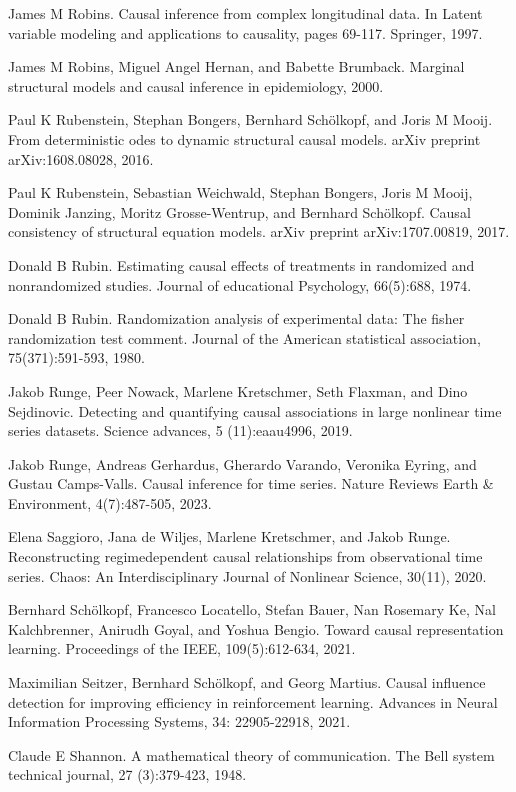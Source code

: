 \documentclass[10pt]{article}
\begin{document}
James M Robins. Causal inference from complex longitudinal data. In Latent variable modeling and applications to causality, pages 69-117. Springer, 1997.

James M Robins, Miguel Angel Hernan, and Babette Brumback. Marginal structural models and causal inference in epidemiology, 2000.

Paul K Rubenstein, Stephan Bongers, Bernhard Schölkopf, and Joris M Mooij. From deterministic odes to dynamic structural causal models. arXiv preprint arXiv:1608.08028, 2016.

Paul K Rubenstein, Sebastian Weichwald, Stephan Bongers, Joris M Mooij, Dominik Janzing, Moritz Grosse-Wentrup, and Bernhard Schölkopf. Causal consistency of structural equation models. arXiv preprint arXiv:1707.00819, 2017.

Donald B Rubin. Estimating causal effects of treatments in randomized and nonrandomized studies. Journal of educational Psychology, 66(5):688, 1974.

Donald B Rubin. Randomization analysis of experimental data: The fisher randomization test comment. Journal of the American statistical association, 75(371):591-593, 1980.

Jakob Runge, Peer Nowack, Marlene Kretschmer, Seth Flaxman, and Dino Sejdinovic. Detecting and quantifying causal associations in large nonlinear time series datasets. Science advances, 5 (11):eaau4996, 2019.

Jakob Runge, Andreas Gerhardus, Gherardo Varando, Veronika Eyring, and Gustau Camps-Valls. Causal inference for time series. Nature Reviews Earth \& Environment, 4(7):487-505, 2023.

Elena Saggioro, Jana de Wiljes, Marlene Kretschmer, and Jakob Runge. Reconstructing regimedependent causal relationships from observational time series. Chaos: An Interdisciplinary Journal of Nonlinear Science, 30(11), 2020.

Bernhard Schölkopf, Francesco Locatello, Stefan Bauer, Nan Rosemary Ke, Nal Kalchbrenner, Anirudh Goyal, and Yoshua Bengio. Toward causal representation learning. Proceedings of the IEEE, 109(5):612-634, 2021.

Maximilian Seitzer, Bernhard Schölkopf, and Georg Martius. Causal influence detection for improving efficiency in reinforcement learning. Advances in Neural Information Processing Systems, 34: 22905-22918, 2021.

Claude E Shannon. A mathematical theory of communication. The Bell system technical journal, 27 (3):379-423, 1948.
\end{document}

